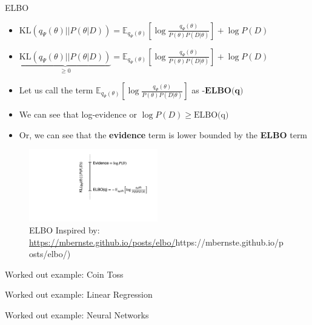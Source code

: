 \documentclass{beamer}
\begin{document}
\begin{frame}{ELBO}
    \begin{itemize}
        \item $\text{KL}(q_{\Psi}(\theta)||P(\theta|D)) =  \mathbb{E}_{q_{\Psi}(\theta)} \left[ \log \frac{q_{\Psi}(\theta)}{P(\theta)P(D|\theta)} \right] + \log P(D)$
        \item \pause $\underbrace{\text{KL}(q_{\Psi}(\theta)||P(\theta|D))}_{\geq 0} =  \mathbb{E}_{q_{\Psi}(\theta)} \left[ \log \frac{q_{\Psi}(\theta)}{P(\theta)P(D|\theta)} \right] + \log P(D)$
        \item \pause Let us call the term $\mathbb{E}_{q_{\Psi}(\theta)} \left[ \log \frac{q_{\Psi}(\theta)}{P(\theta)P(D|\theta)} \right]$ as $\textbf{-ELBO(q)}$
        \item \pause We can see that log-evidence or $\log P(D) \geq \text{ELBO(q)}$
        \item \pause Or, we can see that the \textbf{evidence} term is lower bounded by the \textbf{ELBO} term
    \end{itemize}

    \pause 
    \begin{figure}
        \centering
        \includegraphics[width=0.5\textwidth]{../diagrams/kl-elbo.png}
        \caption{ELBO Inspired by: \url{https://mbernste.github.io/posts/elbo/}{https://mbernste.github.io/posts/elbo/})}
        \label{fig:my_label}
    \end{figure}

\end{frame}
    
\begin{frame}{Worked out example: Coin Toss}
   
\end{frame}

\begin{frame}{Worked out example: Linear Regression}
    
\end{frame}

\begin{frame}{Worked out example: Neural Networks}
\end{frame}

    
\end{document}
